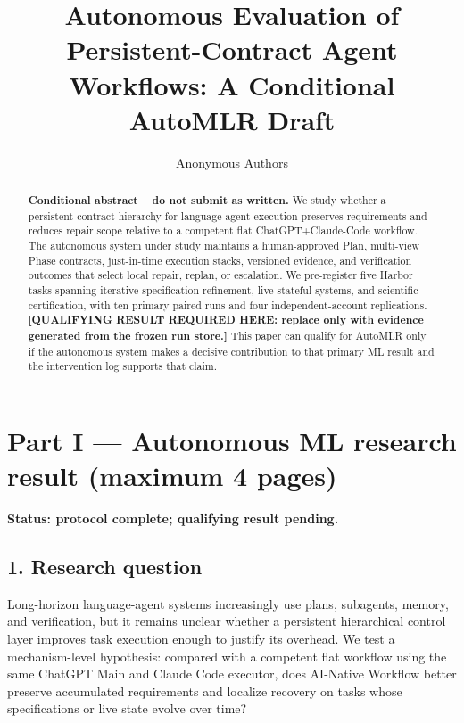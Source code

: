 \documentclass{article}
\title{Autonomous Evaluation of Persistent-Contract Agent Workflows: A Conditional AutoMLR Draft}
\author{Anonymous Authors}
\begin{document}
\maketitle
\begin{center}
\end{center}

\begin{abstract}
\textbf{Conditional abstract -- do not submit as written.} We study whether a persistent-contract hierarchy for language-agent execution preserves requirements and reduces repair scope relative to a competent flat ChatGPT+Claude-Code workflow. The autonomous system under study maintains a human-approved Plan, multi-view Phase contracts, just-in-time execution stacks, versioned evidence, and verification outcomes that select local repair, replan, or escalation. We pre-register five Harbor tasks spanning iterative specification refinement, live stateful systems, and scientific certification, with ten primary paired runs and four independent-account replications. \textbf{[QUALIFYING RESULT REQUIRED HERE: replace only with evidence generated from the frozen run store.] } This paper can qualify for AutoMLR only if the autonomous system makes a decisive contribution to that primary ML result and the intervention log supports that claim.
\end{abstract}

\section*{Part I --- Autonomous ML research result (maximum 4 pages)}
\textbf{Status: protocol complete; qualifying result pending.}

\subsection*{1. Research question}
Long-horizon language-agent systems increasingly use plans, subagents, memory, and verification, but it remains unclear whether a persistent hierarchical control layer improves task execution enough to justify its overhead. We test a mechanism-level hypothesis: compared with a competent flat workflow using the same ChatGPT Main and Claude Code executor, does AI-Native Workflow better preserve accumulated requirements and localize recovery on tasks whose specifications or live state evolve over time?
\end{document}
